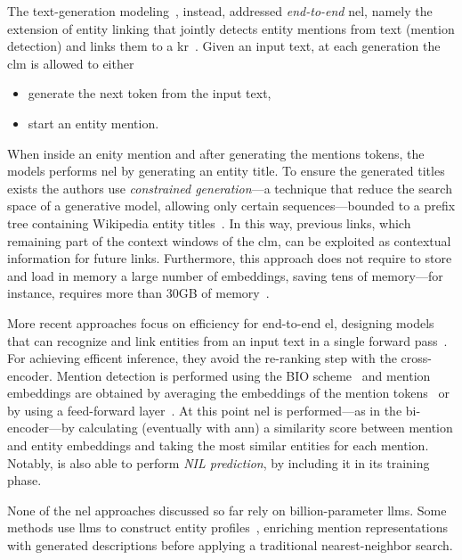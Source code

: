 The text-generation modeling~\cite{decao2021autoregressive}, instead, addressed \emph{end-to-end} \ac{nel}, namely the extension of entity linking that jointly detects entity mentions from text (mention detection) and links them to a \ac{kr}~\cite{kolitsas-etal-2018-end}. Given an input text, at each generation the \ac{clm} is allowed to either
\begin{itemize}
    \item generate the next token from the input text,
    \item start an entity mention.
\end{itemize}
When inside an enity mention and after generating the mentions tokens, the models performs \ac{nel} by generating an entity title. To ensure the generated titles exists the authors use \emph{constrained generation}---a technique that reduce the search space of a generative model, allowing only certain sequences---bounded to a prefix tree containing Wikipedia entity titles~\cite{decao2021autoregressive}. In this way, previous links, which remaining part of the context windows of the \ac{clm}, can be exploited as contextual information for future links. Furthermore, this approach does not require to store and load in memory a large number of embeddings, saving tens of memory---for instance, \textcite{blink} requires more than 30GB of memory~\cite{decao2021autoregressive}.

More recent approaches focus on efficiency for end-to-end \ac{el}, designing models that can recognize and link entities from an input text in a single forward pass~\cite{ayoola-etal-2022-refined,plekhanov2023multilingualendendentity}. For achieving efficent inference, they avoid the re-ranking step with the cross-encoder. Mention detection is performed using the BIO scheme~\cite{ramshaw-marcus-1995-text-bio-scheme} and mention embeddings are obtained by averaging the embeddings of the mention tokens~\cite{ayoola-etal-2022-refined} or by using a feed-forward layer~\cite{plekhanov2023multilingualendendentity}. At this point \ac{nel} is performed---as in the bi-encoder---by calculating (eventually with \ac{ann}) a similarity score between mention and entity embeddings and taking the most similar entities for each mention. 
Notably, \textcite{ayoola-etal-2022-refined} is also able to perform \emph{NIL prediction}, by including it in its training phase.

None of the \ac{nel} approaches discussed so far rely on billion-parameter \acp{llm}. Some methods use \acp{llm} to construct entity profiles~\cite{RYNKIEWICZ2025112185}, enriching mention representations with generated descriptions before applying a traditional nearest-neighbor search.

